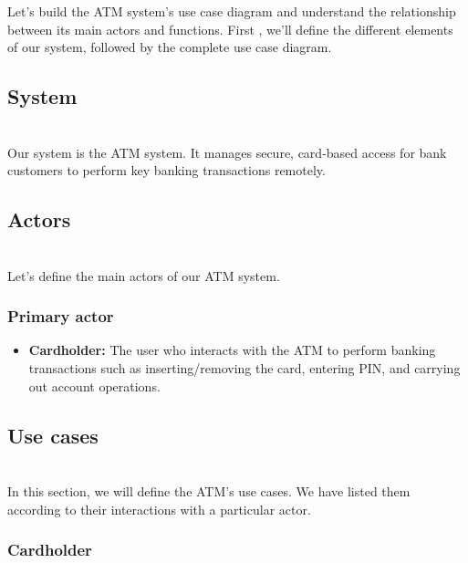 

Let's build the ATM system's use case diagram and understand the relationship between its main actors and functions. First , we'll define the different elements of our system, followed by the complete use case diagram.

\subsection{System}\label{QoayzELP223HIjx5bzBv0}
\\
Our system is the ATM system. It manages secure, card-based access for bank customers to perform key banking transactions remotely.

\subsection{Actors}\label{hK2hPJCBRNicC5p8f6lGE}
\\
Let's define the main actors of our ATM system.

\subsubsection{Primary actor}\label{UVp-MTI1W-7duvN17j3JK}

\begin{itemize}
\item
\protect{}\label{sGlY9A4guN3p8gOc7papt}
\textbf{Cardholder:} The user who interacts with the ATM to perform banking transactions such as inserting/removing the card, entering PIN, and carrying out account operations.
\end{itemize}

\subsection{Use cases}\label{lKpx0WM5oT39Q2zkErepi}
\\
In this section, we will define the ATM's use cases. We have listed them according to their interactions with a particular actor.

\subsubsection{Cardholder}\label{GYH3_q-nOn9lmEi-o1RJs}


